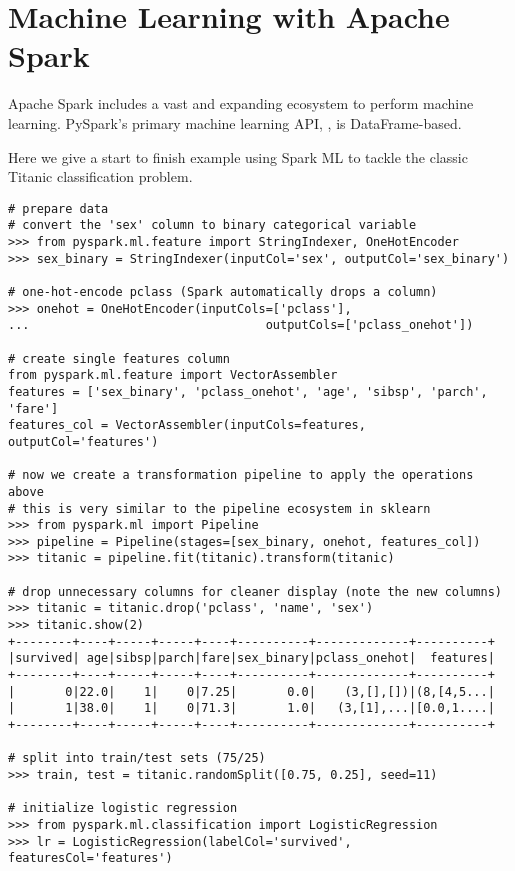 \section*{Machine Learning with Apache Spark}

Apache Spark includes a vast and expanding ecosystem to perform machine learning.
PySpark's primary machine learning API, , is DataFrame-based.

Here we give a start to finish example using Spark ML to tackle the classic Titanic classification problem.
\begin{lstlisting}
# prepare data
# convert the 'sex' column to binary categorical variable
>>> from pyspark.ml.feature import StringIndexer, OneHotEncoder
>>> sex_binary = StringIndexer(inputCol='sex', outputCol='sex_binary')

# one-hot-encode pclass (Spark automatically drops a column)
>>> onehot = OneHotEncoder(inputCols=['pclass'],
...                                 outputCols=['pclass_onehot'])

# create single features column
from pyspark.ml.feature import VectorAssembler
features = ['sex_binary', 'pclass_onehot', 'age', 'sibsp', 'parch', 'fare']
features_col = VectorAssembler(inputCols=features, outputCol='features')

# now we create a transformation pipeline to apply the operations above
# this is very similar to the pipeline ecosystem in sklearn
>>> from pyspark.ml import Pipeline
>>> pipeline = Pipeline(stages=[sex_binary, onehot, features_col])
>>> titanic = pipeline.fit(titanic).transform(titanic)

# drop unnecessary columns for cleaner display (note the new columns)
>>> titanic = titanic.drop('pclass', 'name', 'sex')
>>> titanic.show(2)
+--------+----+-----+-----+----+----------+-------------+----------+
|survived| age|sibsp|parch|fare|sex_binary|pclass_onehot|  features|
+--------+----+-----+-----+----+----------+-------------+----------+
|       0|22.0|    1|    0|7.25|       0.0|    (3,[],[])|(8,[4,5...|
|       1|38.0|    1|    0|71.3|       1.0|   (3,[1],...|[0.0,1....|
+--------+----+-----+-----+----+----------+-------------+----------+

# split into train/test sets (75/25)
>>> train, test = titanic.randomSplit([0.75, 0.25], seed=11)

# initialize logistic regression
>>> from pyspark.ml.classification import LogisticRegression
>>> lr = LogisticRegression(labelCol='survived', featuresCol='features')


\end{lstlisting}
